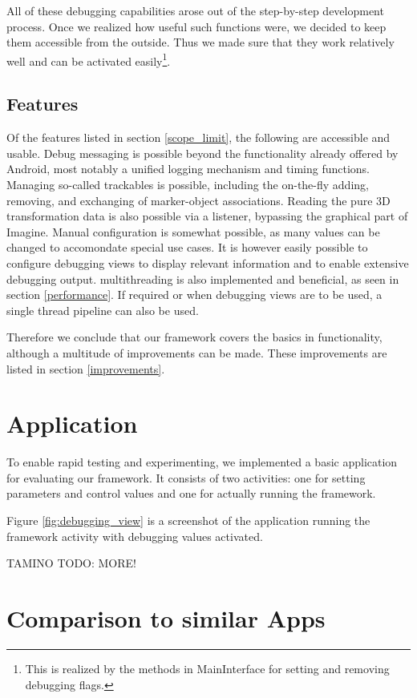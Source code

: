 All of these debugging capabilities arose out of the step-by-step development process.
Once we realized how useful such functions were, we decided to keep them accessible from the outside.
Thus we made sure that they work relatively well and can be activated easily\footnote{This is realized by the methods in MainInterface for setting and removing debugging flags.}.

\subsection{Features}

Of the features listed in section \ref{scope_limit}, the following are accessible and usable.
Debug messaging is possible beyond the functionality already offered by Android, most notably a unified logging mechanism and timing functions.
Managing so-called trackables is possible, including the on-the-fly adding, removing, and exchanging of marker-object associations.
Reading the pure 3D transformation data is also possible via a listener, bypassing the graphical part of Imagine.
Manual configuration is somewhat possible, as many values can be changed to accomondate special use cases.
It is however easily possible to configure debugging views to display relevant information and to enable extensive debugging output.
multithreading is also implemented and beneficial, as seen in section \ref{performance}.
If required or when debugging views are to be used, a single thread pipeline can also be used.

Therefore we conclude that our framework covers the basics in functionality, although a multitude of improvements can be made.
These improvements are listed in section \ref{improvements}.

\section{Application}

To enable rapid testing and experimenting, we implemented a basic application for evaluating our framework.
It consists of two activities: one for setting parameters and control values and one for actually running the framework.

Figure \ref{fig:debugging_view} is a screenshot of the application running the framework activity with debugging values activated.

TAMINO TODO: MORE!

\section{Comparison to similar Apps}

